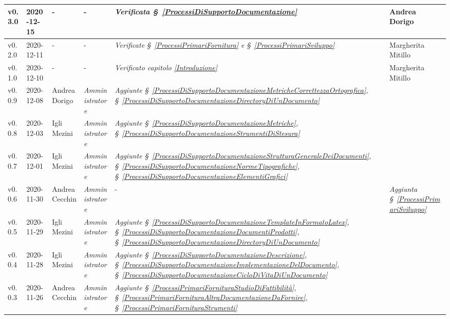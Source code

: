 {\begin{center}
\begin{longtable}[c]{|p{2cm-1\tabcolsep}|p{2cm}|p{3cm-2\tabcolsep}|p{3cm-1.5\tabcolsep}|p{}|p{3cm-2\tabcolsep}|}
		\hline
		\centering v0.3.0 & 2020-12-15 & \centering - & \centering -  & 
		\textit{Verificata  \S~\ref{ProcessiDiSupportoDocumentazione}} & Andrea Dorigo \\
		\hline
		\centering v0.2.0 & 2020-12-11 & \centering - & \centering -  & \textit{Verificate \S~\ref{ProcessiPrimariFornitura} e \S~\ref{ProcessiPrimariSviluppo} } & Margherita Mitillo \\
		\hline
		\centering v0.1.0 & 2020-12-10 & \centering - & \centering - & \textit{Verificato capitolo \ref{Introduzione}} & Margherita Mitillo  \\
		\hline
		\centering v0.0.9 & 2020-12-08 & Andrea Dorigo & \centering \textit{Amministratore} & \textit{Aggiunte  \S~\ref{ProcessiDiSupportoDocumentazioneMetricheCorrettezzaOrtografica}, \S~\ref{ProcessiDiSupportoDocumentazioneDirectoryDiUnDocumento}} & \makecell[c]{-}\\
		\hline
		\centering v0.0.8 & 2020-12-03 & Igli Mezini & \centering \textit{Amministratore} &  \textit{Aggiunte  \S~\ref{ProcessiDiSupportoDocumentazioneMetriche}, \S~\ref{ProcessiDiSupportoDocumentazioneStrumentiDiStesura}}&  \makecell[c]{-}\\
		\hline
		\centering v0.0.7 & 2020-12-01 & Igli Mezini & \centering \textit{Amministratore} &  \textit{Aggiunte  \S~\ref{ProcessiDiSupportoDocumentazioneStrutturaGeneraleDeiDocumenti}, \S~\ref{ProcessiDiSupportoDocumentazioneNormeTipografiche}, \S~\ref{ProcessiDiSupportoDocumentazioneElementiGrafici}} & \makecell[c]{-} \\
		\hline
		\centering v0.0.6 & 2020-11-30 & Andrea Cecchin & \centering \textit{Amministratore} & \centering - & \textit{Aggiunta  \S~\ref{ProcessiPrimariSviluppo}} \makecell[c]{-} \\
		\hline
		\centering v0.0.5 & 2020-11-29 & Igli Mezini & \centering \textit{Amministratore}  & \textit{Aggiunte  \S~\ref{ProcessiDiSupportoDocumentazioneTemplateInFormatoLatex}, \S~\ref{ProcessiDiSupportoDocumentazioneDocumentiProdotti}, \S~\ref{ProcessiDiSupportoDocumentazioneDirectoryDiUnDocumento}} &\makecell[c]{-} \\
		\hline
		\centering v0.0.4 & 2020-11-28 & Igli Mezini & \centering \textit{Amministratore} &  \textit{Aggiunte  \S~\ref{ProcessiDiSupportoDocumentazioneDescrizione}, \S~\ref{ProcessiDiSupportoDocumentazioneImplementazioneDelDocumento}, \S~\ref{ProcessiDiSupportoDocumentazioneCicloDiVitaDiUnDocumento}}  & \makecell[c]{-}\\
		\hline
		\centering v0.0.3 & 2020-11-26 & Andrea Cecchin & \centering \textit{Amministratore} &  \textit{Aggiunte \S~\ref{ProcessiPrimariFornituraStudioDiFattibilità}, \S~\ref{ProcessiPrimariFornituraAltraDocumentazioneDaFornire}, \S~\ref{ProcessiPrimariFornituraStrumenti}}  & \makecell[c]{-} \\

\end{longtable}
\end{center}}
